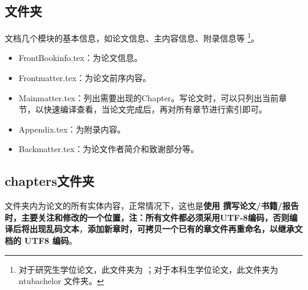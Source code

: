 \subsection{ \projectname 文件夹}
文档几个模块的基本信息，如论文信息、主内容信息、附录信息等 \footnote{对于研究生学位论文，此文件夹为 \projectname；对于本科生学位论文，此文件夹为 ntubachelor 文件夹。}。
\begin{itemize}
    \item FrontBookinfo.tex：为论文信息。
    \item Frontmatter.tex：为论文前序内容。
    \item Mainmatter.tex：列出需要出现的Chapter。写论文时，可以只列出当前章节，以快速编译查看，当论文完成后，再对所有章节进行索引即可。
    \item Appendix.tex：为附录内容。
    \item Backmatter.tex：为论文作者简介和致谢部分等。
\end{itemize}

\subsection{chapters文件夹}
文件夹内为论文的所有实体内容，正常情况下，这也是\textbf{使用 \projectname 撰写论文/书籍/报告时，主要关注和修改的一个位置，注：所有文件都必须采用UTF-8编码，否则编译后将出现乱码文本}，\textbf{添加新章时，可拷贝一个已有的章文件再重命名，以继承文档的 UTF8 编码}。

